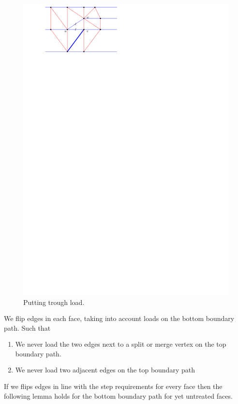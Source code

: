 \begin{figure}[h]
  \centering
  \includegraphics[scale=1]{blueFaceSubdivision/img/puttingTroughLoad.pdf}
  \caption{Putting trough load.}
  \label{fig:subdiv:putTrougLoad}
\end{figure}


We flip edges in each face, taking into account loads on the bottom boundary path. Such that

\begin{enumerate}
  \item We never load the two edges next to a split or merge vertex on the top boundary path.
  \item We never load two adjacent edges on the top boundary path
\end{enumerate}

If we flips edges in line with the step requirements for every face then the following lemma holds for the bottom boundary path for yet untreated faces.

